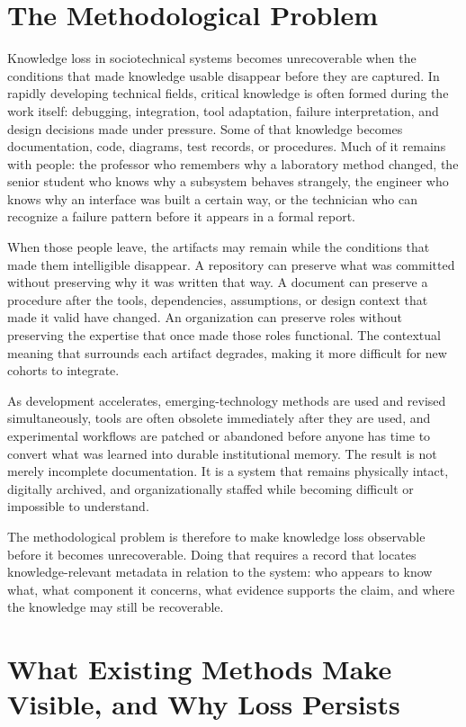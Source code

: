 \documentclass[conference]{IEEEtran}
\begin{document}
\section{The Methodological Problem}\label{sec:1}

Knowledge loss in sociotechnical systems becomes unrecoverable when the conditions that made knowledge usable disappear before they are captured. In rapidly developing technical fields, critical knowledge is often formed during the work itself: debugging, integration, tool adaptation, failure interpretation, and design decisions made under pressure. Some of that knowledge becomes documentation, code, diagrams, test records, or procedures. Much of it remains with people: the professor who remembers why a laboratory method changed, the senior student who knows why a subsystem behaves strangely, the engineer who knows why an interface was built a certain way, or the technician who can recognize a failure pattern before it appears in a formal report.

When those people leave, the artifacts may remain while the conditions that made them intelligible disappear. A repository can preserve what was committed without preserving why it was written that way. A document can preserve a procedure after the tools, dependencies, assumptions, or design context that made it valid have changed. An organization can preserve roles without preserving the expertise that once made those roles functional. The contextual meaning that surrounds each artifact degrades, making it more difficult for new cohorts to integrate.

As development accelerates, emerging-technology methods are used and revised simultaneously, tools are often obsolete immediately after they are used, and experimental workflows are patched or abandoned before anyone has time to convert what was learned into durable institutional memory. The result is not merely incomplete documentation. It is a system that remains physically intact, digitally archived, and organizationally staffed while becoming difficult or impossible to understand.

The methodological problem is therefore to make knowledge loss observable before it becomes unrecoverable. Doing that requires a record that locates knowledge-relevant metadata in relation to the system: who appears to know what, what component it concerns, what evidence supports the claim, and where the knowledge may still be recoverable.

\section{What Existing Methods Make Visible, and Why Loss Persists}\label{sec:2}
\end{document}

